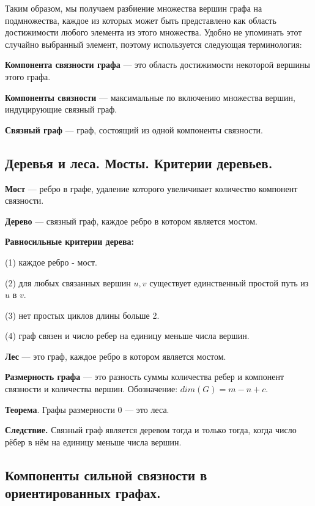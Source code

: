 \documentclass[a4paper, 10pt]{article}
\begin{document}
Таким образом, мы получаем разбиение множества вершин графа на подмножества, каждое из которых может быть представлено как область достижимости любого элемента из этого множества. Удобно не упоминать этот случайно выбранный элемент, поэтому используется следующая терминология: 

\textbf{Компонента связности графа} --- это область достижимости некоторой вершины этого графа.

\textbf{Компоненты связности} --- максимальные по включению множества вершин, индуцирующие связный граф.

\textbf{Связный граф} --- граф, состоящий из одной компоненты связности.


\subsection{Деревья и леса. Мосты. Критерии деревьев.}

\textbf{Мост} --- ребро в графе, удаление которого увеличивает количество компонент связности.

\textbf{Дерево} --- связный граф, каждое ребро в котором является мостом.

\textbf{Равносильные критерии дерева:}

(1) каждое ребро - мост.

(2) для любых связанных вершин $u, v$ существует единственный простой путь из $u$ в $v$.

(3) нет простых циклов длины больше 2.

(4) граф связен и число ребер на единицу меньше числа вершин.

\vspace{2mm}

\textbf{Лес} --- это граф, каждое ребро в котором является мостом.

\textbf{Размерность графа} --- это разность суммы количества ребер и компонент связности и количества вершин. Обозначение: $dim(G) = m - n + c$.

\textbf{Теорема}. Графы размерности 0 --- это леса.

\textbf{Следствие.} Связный граф является деревом тогда и только тогда, когда число рёбер в нём на единицу меньше числа вершин.


\subsection{Компоненты сильной связности в ориентированных графах.}
\end{document}
